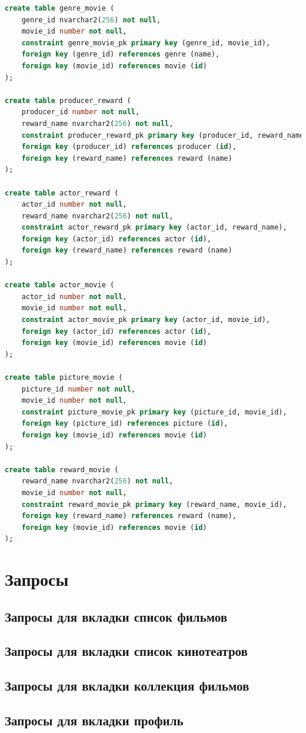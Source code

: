 \documentclass[a4paper,16pt]{article}
\begin{document}
\begin{lstlisting}[language=SQL]
create table genre_movie (
    genre_id nvarchar2(256) not null,
    movie_id number not null,
    constraint genre_movie_pk primary key (genre_id, movie_id),
    foreign key (genre_id) references genre (name),
    foreign key (movie_id) references movie (id)
);

create table producer_reward (
    producer_id number not null,
    reward_name nvarchar2(256) not null, 
    constraint producer_reward_pk primary key (producer_id, reward_name),
    foreign key (producer_id) references producer (id),
    foreign key (reward_name) references reward (name)
);

create table actor_reward (
    actor_id number not null,
    reward_name nvarchar2(256) not null,
    constraint actor_reward_pk primary key (actor_id, reward_name),
    foreign key (actor_id) references actor (id),
    foreign key (reward_name) references reward (name)
);

create table actor_movie (
    actor_id number not null,
    movie_id number not null,
    constraint actor_movie_pk primary key (actor_id, movie_id),
    foreign key (actor_id) references actor (id),
    foreign key (movie_id) references movie (id)
);

create table picture_movie (
    picture_id number not null,
    movie_id number not null,
    constraint picture_movie_pk primary key (picture_id, movie_id),
    foreign key (picture_id) references picture (id),
    foreign key (movie_id) references movie (id)
);

create table reward_movie (
    reward_name nvarchar2(256) not null,
    movie_id number not null,
    constraint reward_movie_pk primary key (reward_name, movie_id),
    foreign key (reward_name) references reward (name),
    foreign key (movie_id) references movie (id)
);
\end{lstlisting}

\section{Запросы}
\subsection{Запросы для вкладки список фильмов}
\subsection{Запросы для вкладки список кинотеатров}
\subsection{Запросы для вкладки коллекция фильмов}
\subsection{Запросы для вкладки профиль}

                                   

\end{document}
